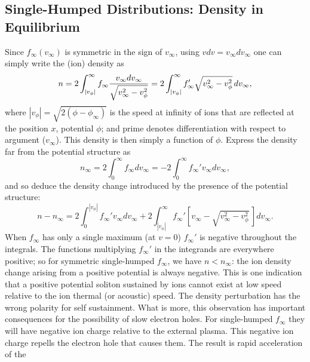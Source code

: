 \documentclass[pre]{revtex4-2}
\begin{document}
\subsection{Single-Humped Distributions: Density in Equilibrium}

Since $f_\infty(v_\infty)$ is symmetric in the sign of $v_\infty$,
using $vdv=v_\infty dv_\infty$ one can simply write the (ion) density
as
\begin{equation}
\label{symden}
  n = 2\int_{|v_\phi|}^\infty f_\infty {v_\infty dv_\infty\over
    \sqrt{v_\infty^2-v_\phi^2} }  
  = 2\int_{|v_\phi|}^\infty f_\infty'\sqrt{v_\infty^2-v_\phi^2}\,
  dv_\infty,
\end{equation}
where $|v_\phi|=\sqrt{2(\phi-\phi_\infty)}$ is the speed at infinity
of ions that are reflected at the position $x$, potential $\phi$; and
prime denotes differentiation with respect to argument
($v_\infty$). This density is then simply a function of $\phi$.
Express the density far from the potential structure as
\begin{equation}
n_\infty=2\int_0^\infty f_\infty dv_\infty=-2\int_0^\infty f_\infty'
v_\infty dv_\infty,
\end{equation}
and so deduce the density change introduced by the presence of the
potential structure:
\begin{equation}
  n-n_\infty=2\int_0^{|v_\phi|}f_\infty'v_\infty dv_\infty +
  2\int_{|v_\phi|}^{\infty}f_\infty'\left[v_\infty-\sqrt{v_\infty^2-v_\phi^2}\,\right] dv_\infty.
\end{equation}
When $f_\infty$ has only a single maximum (at $v=0$) $f_\infty'$ is
negative throughout the integrals. The functions multiplying
$f_\infty'$ in the integrands are everywhere positive; so for
symmetric single-humped $f_\infty$, we have $n<n_\infty$: the ion
density change arising from a positive potential is always
negative. This is one indication that a positive potential soliton
sustained by ions cannot exist at low speed relative to the ion
thermal (or acoustic) speed. The density perturbation has the wrong
polarity for self sustainment. What is more, this observation has
important consequences for the possibility of slow electron holes.
For single-humped $f_\infty$ they will have negative ion charge
relative to the external plasma. This negative ion charge repells
the electron
hole that causes them. The result is rapid acceleration of the
\end{document}
